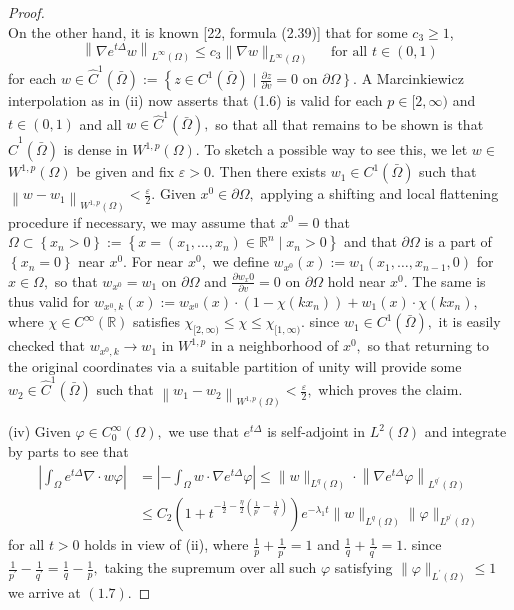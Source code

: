 \begin{proof}
$$	$$
	On the other hand, it is known [22, formula (2.39)] that for some $c_{3} \geqslant 1$,
	$$
	\left\|\nabla e^{t \Delta} w\right\|_{L^{\infty}(\Omega)} \leqslant c_{3}\|\nabla w\|_{L^{\infty}(\Omega)} \quad \text { for all } t \in(0,1)
	$$
	for each $w \in \hat{C}^{1}(\bar{\Omega}):=\left\{z \in C^{1}(\bar{\Omega}) \mid \frac{\partial z}{\partial v}=0\right.$ on $\left.\partial \Omega\right\} .$ A Marcinkiewicz interpolation as in
	(ii) now asserts that (1.6) is valid for each $p \in[2, \infty)$ and $t \in(0,1)$ and all $w \in \hat{C}^{1}(\bar{\Omega}),$ so that all that remains to be shown is that $\hat{C}^{1}(\bar{\Omega})$ is dense in $W^{1, p}(\Omega) .$ To sketch a possible way to see this, we let $w \in$ $W^{1, p}(\Omega)$ be given and fix $\varepsilon>0 .$ Then there exists $w_{1} \in C^{1}(\bar{\Omega})$ such that $\left\|w-w_{1}\right\|_{W^{1, p}(\Omega)}<\frac{\varepsilon}{2} .$ Given $x^{0} \in \partial \Omega,$ applying a shifting and local flattening procedure if necessary, we may assume that $x^{0}=0$ that $\Omega \subset\left\{x_{n}>0\right\}:=\left\{x=\left(x_{1}, \ldots, x_{n}\right) \in \mathbb{R}^{n} \mid x_{n}>0\right\}$ and that $\partial \Omega$ is a part of $\left\{x_{n}=0\right\}$ near $x^{0} .$ For
	near $x^{0},$ we define $w_{x^{0}}(x):=w_{1}\left(x_{1}, \ldots, x_{n-1}, 0\right)$ for $x \in \Omega,$ so that $w_{x^{0}}=w_{1}$ on $\partial \Omega$ and $\frac{\partial w_{x} 0}{\partial v}=0$
	on $\partial \Omega$ hold near $x^{0}$. The same is thus valid for $w_{x^{0}, k}(x):=w_{x^{0}}(x) \cdot\left(1-\chi\left(k x_{n}\right)\right)+w_{1}(x) \cdot \chi\left(k x_{n}\right)$, where $\chi \in C^{\infty}(\mathbb{R})$ satisfies $\chi_{[2, \infty)} \leqslant \chi \leqslant \chi_{[1, \infty)} .$ since $w_{1} \in C^{1}(\bar{\Omega}),$ it is easily checked that $w_{x^{0}, k} \rightarrow w_{1}$
	in $W^{1, p}$ in a neighborhood of $x^{0},$ so that returning to the original coordinates via a suitable partition of unity will provide some $w_{2} \in \hat{C}^{1}(\bar{\Omega})$ such that $\left\|w_{1}-w_{2}\right\|_{W^{1, p}(\Omega)}<\frac{\varepsilon}{2},$ which proves the claim.
	
	(iv) Given $\varphi \in C_{0}^{\infty}(\Omega),$ we use that $e^{t \Delta}$ is self-adjoint in $L^{2}(\Omega)$ and integrate by parts to see that
	$$
	\begin{aligned}
		\left|\int_{\Omega} e^{t \Delta} \nabla \cdot w \varphi\right| &=\left|-\int_{\Omega} w \cdot \nabla e^{t \Delta} \varphi\right| \leqslant\|w\|_{L^{q}(\Omega)} \cdot\left\|\nabla e^{t \Delta} \varphi\right\|_{L^{q^{\prime}}(\Omega)} \\
		& \leqslant C_{2}\left(1+t^{-\frac{1}{2}-\frac{\eta}{2}\left(\frac{1}{p^{\prime}}-\frac{1}{q^{\prime}}\right)}\right) e^{-\lambda_{1} t}\|w\|_{L^{q}(\Omega)}\|\varphi\|_{L^{p^{\prime}}(\Omega)}
	\end{aligned}
	$$
	for all $t>0$ holds in view of (ii), where $\frac{1}{p}+\frac{1}{p^{\prime}}=1$ and $\frac{1}{q}+\frac{1}{q^{\prime}}=1 .$ since $\frac{1}{p^{\prime}}-\frac{1}{q^{\prime}}=\frac{1}{q}-\frac{1}{p},$ taking the
	supremum over all such $\varphi$ satisfying $\|\varphi\|_{L^{\prime}(\Omega)} \leqslant 1$ we arrive at $(1.7) .$
\end{proof}
